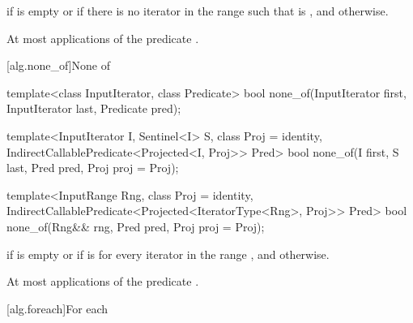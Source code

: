 \begin{itemdescr}
\pnum
\returns {} if  is empty or
if there is no iterator  in the range
 such that
is , and  otherwise.

\pnum
\complexity At most  applications of the predicate
.
\end{itemdescr}

[alg.none_of]{None of}

%
\begin{removedblock}
\begin{itemdecl}
template<class InputIterator, class Predicate>
  bool none_of(InputIterator first, InputIterator last, Predicate pred);
\end{itemdecl}
\end{removedblock}
\begin{addedblock}
\begin{itemdecl}
template<InputIterator I, Sentinel<I> S, class Proj = identity,
    IndirectCallablePredicate<Projected<I, Proj>> Pred>
  bool none_of(I first, S last, Pred pred, Proj proj = Proj{});

template<InputRange Rng, class Proj = identity,
    IndirectCallablePredicate<Projected<IteratorType<Rng>, Proj>> Pred>
  bool none_of(Rng&& rng, Pred pred, Proj proj = Proj{});
\end{itemdecl}
\end{addedblock}

\begin{itemdescr}
\pnum
\returns {} if
 is empty or if
is  for every iterator  in the range ,
and  otherwise.

\pnum
\complexity At most  applications of the predicate
.
\end{itemdescr}

[alg.foreach]{For each}

